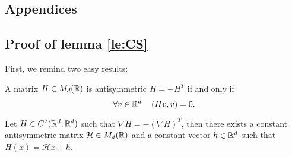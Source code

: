 \begin{subappendices}
\renewcommand{\thesection}{\Alph{section}}
\section{Appendices}

\subsection{Proof of lemma \ref{le:CS}} %
	\label{sec:proof_of_lemma_CS}
First, we remind two easy results:
\begin{lemma}\label{le:antisym}
	A matrix $H\in M_d({\mathbb R})$ is antisymmetric $H=-H^T$ if and only if \[\forall  v \in {\mathbb R}^d \quad \left( Hv,v \right)=0.\]
\end{lemma}%
\begin{lemma}\label{le:antisym2}Let $H\in C^2({\mathbb R^d}, {\mathbb R^d})$ such that $\nabla H=-(\nabla H)^T$, then there exists a constant antisymmetric matrix $\mathcal H\in M_d({\mathbb R})$ and a constant vector $h\in {\mathbb R^d}$ such that $H(x)=\mathcal Hx+h$.
\end{lemma}


\end{subappendices}
